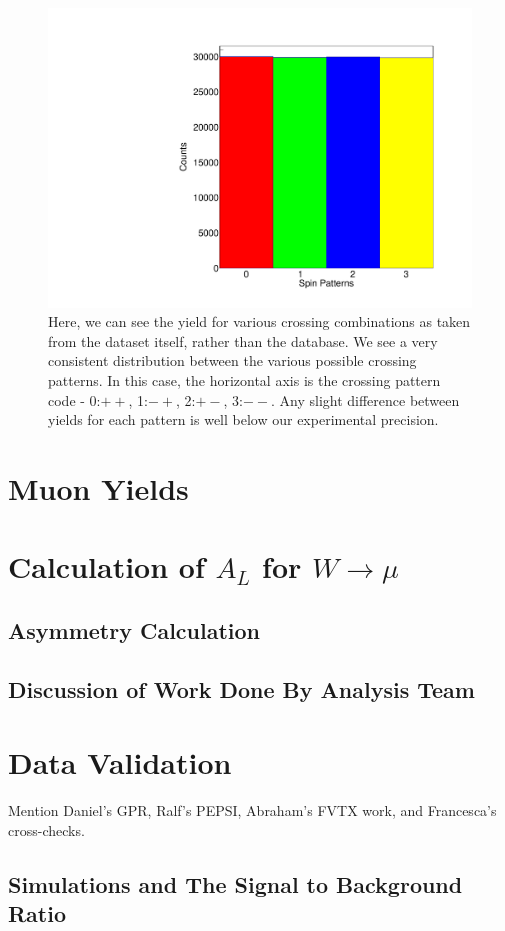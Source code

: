 \begin{figure}
  \centering
  \includegraphics[width=0.6\linewidth]{./figures/crossing_pattenr_count.pdf}
  \caption{
    Here, we can see the yield for various crossing combinations as taken from
    the dataset itself, rather than the database. We see a very consistent
    distribution between the various possible crossing patterns. In this case,
    the horizontal axis is the crossing pattern code - 0:$++$, 1:$-+$, 2:$+-$,
    3:$--$. Any slight difference between yields for each pattern is well below
    our experimental precision.
  }
  \label{fig:polarization_counts}
\end{figure}

\clearpage
\section{Muon Yields}


\section{Calculation of $A_{L}$ for $W\rightarrow\mu$}
\subsection{Asymmetry Calculation}
\subsection{Discussion of Work Done By Analysis Team}

\section{Data Validation}
Mention Daniel's GPR, Ralf's PEPSI, Abraham's FVTX work, and Francesca's cross-checks.
\subsection{Simulations and The Signal to Background Ratio}

